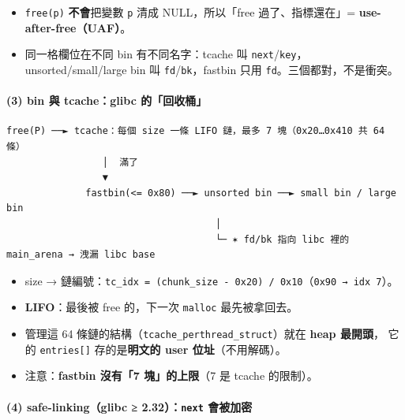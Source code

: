 \documentclass[10pt,a4paper]{article}
\providecommand{\tightlist}{%
  \setlength{\itemsep}{0pt}\setlength{\parskip}{0pt}}
\begin{document}
\begin{itemize}
\tightlist
\item
  \texttt{free(p)} \textbf{不會}把變數 \texttt{p} 清成 NULL，所以「free
  過了、指標還在」= \textbf{use-after-free（UAF）}。
\item
  同一格欄位在不同 bin 有不同名字：tcache 叫
  \texttt{next}/\texttt{key}， unsorted/small/large bin 叫
  \texttt{fd}/\texttt{bk}，fastbin 只用
  \texttt{fd}。三個都對，不是衝突。
\end{itemize}

\paragraph{(3) bin 與 tcache：glibc
的「回收桶」}\label{bin-ux8207-tcacheglibc-ux7684ux56deux6536ux6876}

\begin{Verbatim}[breaklines=true,breakanywhere=true,breakautoindent=false,fontsize=\fontsize{7.0}{9.5}\selectfont]
  free(P) ──► tcache：每個 size 一條 LIFO 鏈，最多 7 塊（0x20…0x410 共 64 條）
                 │  滿了
                 ▼
              fastbin(<= 0x80) ──► unsorted bin ──► small bin / large bin
                                     │
                                     └─ ✶ fd/bk 指向 libc 裡的 main_arena → 洩漏 libc base
\end{Verbatim}

\begin{itemize}
\tightlist
\item
  size →
  鏈編號：\texttt{tc\_\allowbreak{}idx\ \allowbreak{}=\ \allowbreak{}(chunk\_\allowbreak{}size\ \allowbreak{}-\allowbreak{}\ \allowbreak{}0x20)\ \allowbreak{}/\allowbreak{}\ \allowbreak{}0x10}（\texttt{0x90\ \allowbreak{}→\ \allowbreak{}idx\ \allowbreak{}7}）。
\item
  \textbf{LIFO}：最後被 free 的，下一次 \texttt{malloc} 最先被拿回去。
\item
  管理這 64 條鏈的結構（\texttt{tcache\_\allowbreak{}perthread\_\allowbreak{}struct}）就在
  \textbf{heap 最開頭}， 它的 \texttt{entries{[}{]}}
  存的是\textbf{明文的 user 位址}（不用解碼）。
\item
  注意：\textbf{fastbin 沒有「7 塊」的上限}（7 是 tcache 的限制）。
\end{itemize}

\paragraph{\texorpdfstring{(4) safe-linking（glibc ≥
2.32）：\texttt{next}
會被加密}{(4) safe-linking（glibc ≥ 2.32）：next 會被加密}}\label{safe-linkingglibc-2.32next-ux6703ux88abux52a0ux5bc6}
\end{document}
